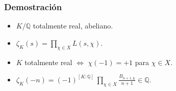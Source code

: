 \documentclass{beamer}
\newcommand{\QQ}{\mathbb{Q}}
\begin{document}

\begin{frame}
  \frametitle{Demostración}

  \begin{itemize}
  \item<1-> $K/\QQ$ totalmente real, abeliano.

  \item<2-> $\zeta_K (s) = \prod_{\chi\in X} L (s,\chi)$.

  \item<3-> $K$ totalmente real $\iff$ $\chi (-1) = +1$ para $\chi \in X$.

  \item<4-> $\zeta_K (-n) = (-1)^{[K:\QQ]}\,\prod_{\chi \in X} \frac{B_{n+1,\chi}}{n+1} \in \QQ$.
  \end{itemize}
\end{frame}

\end{document}

